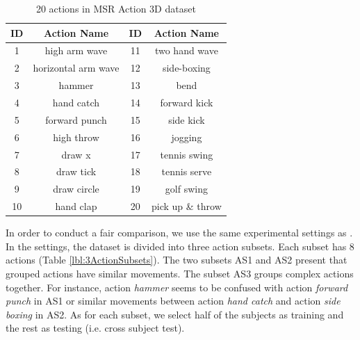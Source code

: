 \documentclass[review]{elsarticle}
\begin{document}
\begin{table}[H]
	\begin{center}
		\begin{tabular}{c|c|c|c}
		
		  {\bf   ID  } & {\bf Action Name} &   {\bf   ID  } & {\bf Action Name} \\
		\hline
		             1 &  high arm wave &             11 &  two hand wave \\
		
		             2 & horizontal arm wave &             12 &    side-boxing \\
		
		             3 &         hammer &             13 &           bend \\
		
		             4 &     hand catch &             14 &   forward kick \\
		
		             5 &  forward punch &             15 &      side kick \\
		
		             6 &     high throw &             16 &        jogging \\
		
		             7 &         draw x &             17 &   tennis swing \\
		
		             8 &      draw tick &             18 &   tennis serve \\
		
		             9 &    draw circle &             19 &     golf swing \\
		
		            10 &      hand clap &             20 & pick up \& throw \\
		
		\end{tabular}
	\end{center}
	\caption{\label{lbl:20actions}20 actions in MSR Action 3D dataset}
\end{table}

In order to conduct a fair comparison, we use the same experimental settings as \cite{li2010action, yang2012eigenjoints, yang2012recognizing, wang2012mining, xia2013spatio, oreifej2013hon4d}. In the settings, the dataset is divided into three action subsets. Each subset has 8 actions (Table \ref{lbl:3ActionSubsets}). The two subsets AS1 and AS2 present that grouped actions have similar movements. The subset AS3 groups complex actions together. For instance, action \textit{hammer} seems to be confused with action \textit{forward punch} in AS1 or similar movements between action \textit{hand catch} and action \textit{side boxing} in AS2. As for each subset, we select half of the subjects as training and the rest as testing (i.e. cross subject test).
\end{document}
